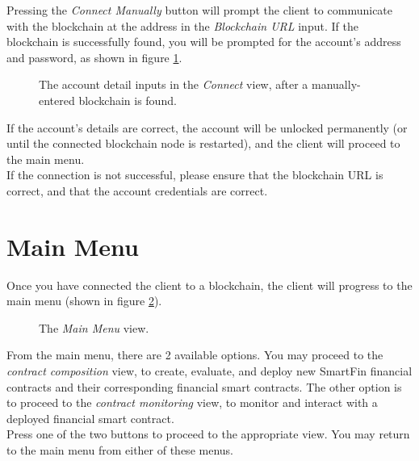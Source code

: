 Pressing the \textit{Connect Manually} button will prompt the client to communicate with the blockchain at the address in the \textit{Blockchain URL} input. If the blockchain is successfully found, you will be prompted for the account's address and password, as shown in figure \ref{UG:fig:connect-account}.

\begin{figure}[h]
    \centering
    \caption{The account detail inputs in the \textit{Connect} view, after a manually-entered blockchain is found.}
    \label{UG:fig:connect-account}
\end{figure}

If the account's details are correct, the account will be unlocked permanently (or until the connected blockchain node is restarted), and the client will proceed to the main menu. \\

If the connection is not successful, please ensure that the blockchain URL is correct, and that the account credentials are correct.


\section{Main Menu}

Once you have connected the client to a blockchain, the client will progress to the main menu (shown in figure \ref{UG:fig:main-menu}).

\begin{figure}[h]
    \centering
    \caption{The \textit{Main Menu} view.}
    \label{UG:fig:main-menu}
\end{figure}

From the main menu, there are 2 available options. You may proceed to the \textit{contract composition} view, to create, evaluate, and deploy new SmartFin financial contracts and their corresponding financial smart contracts. The other option is to proceed to the \textit{contract monitoring} view, to monitor and interact with a deployed financial smart contract. \\

Press one of the two buttons to proceed to the appropriate view. You may return to the main menu from either of these menus.


